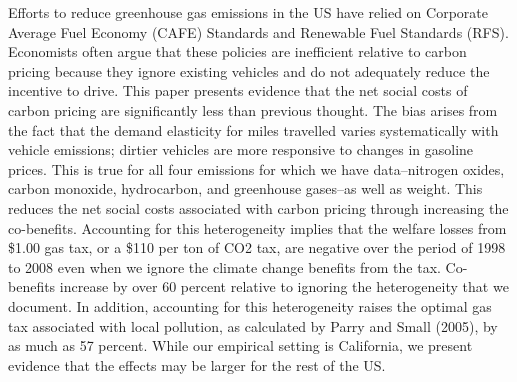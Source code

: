 Efforts to reduce greenhouse gas emissions in the US have relied on Corporate Average Fuel Economy (CAFE) Standards and Renewable Fuel Standards (RFS). Economists often argue that these policies are inefficient relative to carbon pricing because they ignore existing vehicles and do not adequately reduce the incentive to drive. This paper presents evidence that the net social costs of carbon pricing are significantly less than previous thought. The bias arises from the fact that the demand elasticity for miles travelled varies systematically with vehicle emissions; dirtier vehicles are more responsive to changes in gasoline prices. This is true for all four emissions for which we have data--nitrogen oxides, carbon monoxide, hydrocarbon, and greenhouse gases--as well as weight. This reduces the net social costs associated with carbon pricing through increasing the co-benefits. Accounting for this heterogeneity implies that the welfare losses from \$1.00 gas tax, or a \$110 per ton of CO2 tax, are negative over the period of 1998 to 2008 even when we ignore the climate change benefits from the tax. Co-benefits increase by over 60 percent relative to ignoring the heterogeneity that we document. In addition, accounting for this heterogeneity raises the optimal gas tax associated with local pollution, as calculated by Parry and Small (2005), by as much as 57 percent. While our empirical setting is California, we present evidence that the effects may be larger for the rest of the US.
